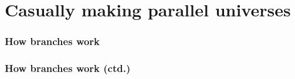 \documentclass[12pt]{beamer}
\begin{document}
\section{Casually making parallel universes}

\begin{frame}
  \frametitle{How branches work}

\end{frame}

\begin{frame}
  \frametitle{How branches work (ctd.)}

\end{frame}
\end{document}
